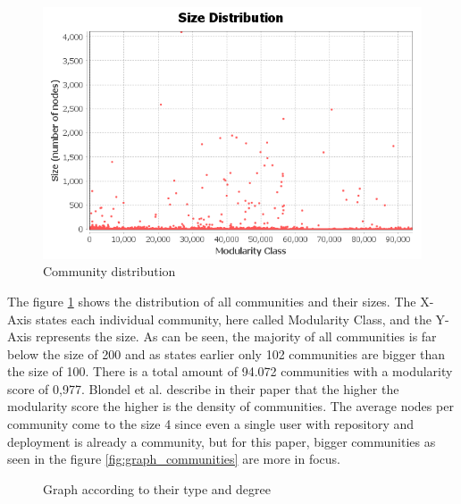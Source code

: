 \begin{figure}[H]
    \centering
    \includegraphics[scale=0.8]{graphics/modularity_stats.png}
    \caption{Community distribution}
    \label{fig:community_distribution}
\end{figure}

The figure \ref{fig:community_distribution} shows the distribution of all communities and their sizes. The X-Axis states each individual community, here called Modularity Class, and the Y-Axis represents the size. As can be seen, the majority of all communities is far below the size of 200 and as states earlier only 102 communities are bigger than the size of 100. There is a total amount of 94.072 communities with a modularity score of 0,977. Blondel et al. describe in their paper that the higher the modularity score the higher is the density of communities\cite{Blondel_2008}. The average nodes per community come to the size 4 since even a single user with repository and deployment is already a community, but for this paper, bigger communities as seen in the figure \ref{fig:graph_communities} are more in focus.

\begin{figure}[H]\centering
{}
    \caption{Graph according to their type and degree}
    \label{fig:graph_types}
\end{figure}

